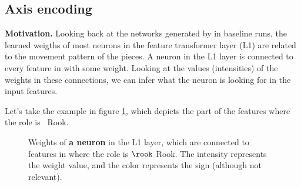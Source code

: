 \subsection{Axis encoding}
\label{sec:axis_encoding}

\textbf{Motivation.} Looking back at the networks generated by  in baseline runs, the learned weigths of most neurons in the feature transformer layer (L1) are related to the movement pattern of the pieces. A neuron in the L1 layer is connected to every feature in  with some weight. Looking at the values (intensities) of the weights in these connections, we can infer what the neuron is looking for in the input features.

Let's take the example in figure \ref{fig:rook_weights}, which depicts the  part of the features where the role is \symrook\ Rook.

\begin{figure}[h]
\centering
{}%
\qquad
{}%
\caption{Weights of \textbf{a neuron} in the L1 layer, which are connected to features in  where the role is $\rook$ Rook. The intensity represents the weight value, and the color represents the sign (although not relevant).}
\label{fig:rook_weights}
\end{figure}

